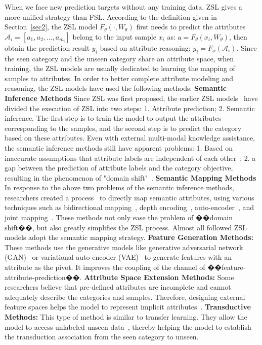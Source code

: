 When we face new prediction targets without any training data, ZSL gives a more unified strategy than FSL. According to the definition given in Section~\ref{sec2}, the ZSL model $F_{\theta} \left(\cdot, W_{\theta} \right)$ first needs to predict the attributes $\mathcal{A}_{i} = \left[a_1, a_2, \dots, a_{m_i} \right]$ belong to the input sample $x_{i}$ as: $\mathrm{a} = F_{\theta} \left(x_{i}, W_{\theta} \right)$, then obtain the prediction result $y_{i}$ based on attribute reasoning: $y_{i} = F_{\phi} \left(\mathcal{A}_{i} \right)$. Since the seen category and the unseen category share an attribute space, when training, the ZSL models are usually dedicated to learning the mapping of samples to attributes. In order to better complete attribute modeling and reasoning, the ZSL models have used the following methods:
\textbf{Semantic Inference Methods} Since ZSL was first proposed, the earlier ZSL models~ have divided the execution of ZSL into two steps: 1. Attribute prediction; 2. Semantic inference. The first step is to train the model to output the attributes corresponding to the samples, and the second step is to predict the category based on these attributes. Even with external multi-modal knowledge assistance, the semantic inference methods still have apparent problems: 1. Based on inaccurate assumptions that attribute labels are independent of each other~; 2. a gap between the prediction of attribute labels and the category objective, resulting in the phenomenon of "domain shift"~.
\textbf{Semantic Mapping Methods} In response to the above two problems of the semantic inference methods, researchers created a  process~ to directly map semantic attributes, using various techniques such as bidirectional mapping~, depth encoding~, auto-encoder~, and joint mapping~. These methods not only ease the problem of ��domain shift��, but also greatly simplifies the ZSL process. Almost all followed ZSL models adopt the semantic mapping strategy.
\textbf{Feature Generation Methods:} These methods use the generative models like generative adversarial network (GAN)~ or  variational auto-encoder (VAE)~ to generate features with an attribute as the pivot. It improves the coupling of the channel of ��feature-attribute-prediction��.
\textbf{Attribute Space Extension Methods:} Some researchers believe that pre-defined attributes are incomplete and cannot adequately describe the categories and samples. Therefore, designing external feature spaces helps the model to represent implicit attributes~.
\textbf{Transductive Methods:} This type of method is similar to transfer learning. They allow the model to access unlabeled unseen data~, thereby helping the model to establish the transduction association from the seen category to unseen.
